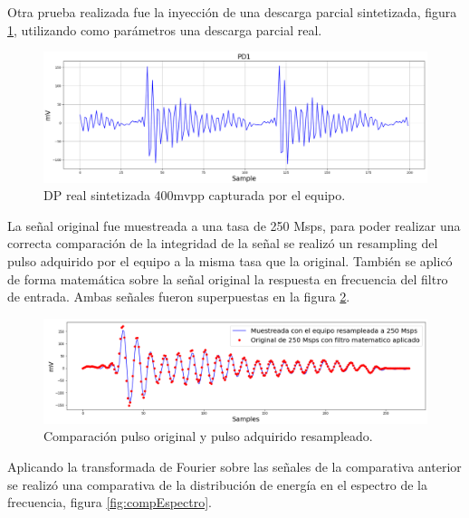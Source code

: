 \vspace{5mm}


Otra prueba realizada fue la inyección de una descarga parcial sintetizada, figura \ref{fig:dpSint}, utilizando como parámetros una descarga parcial real. 

\begin{figure}[ht]
	\centering
	\includegraphics[width=140mm]{./Figures/dpSint.png}
	\caption{DP real sintetizada 400mvpp capturada por el equipo.}
	\label{fig:dpSint}
\end{figure}

La señal original fue muestreada a una tasa de 250 Msps, para poder realizar una correcta comparación de la integridad de la señal se realizó un resampling del pulso adquirido por el equipo a la misma tasa que la original. También se aplicó de forma matemática sobre la señal original la respuesta en frecuencia del filtro de entrada. Ambas señales fueron superpuestas en la figura \ref{fig:compPulsos}.

\begin{figure}[ht]
	\centering
	\includegraphics[width=140mm]{./Figures/compPulsos.png}
	\caption{Comparación pulso original y pulso adquirido resampleado.}
	\label{fig:compPulsos}
\end{figure}

\vspace{20mm}

Aplicando la transformada de Fourier sobre las señales de la comparativa anterior se realizó una comparativa de la distribución de energía en el espectro de la frecuencia, figura \ref{fig:compEspectro}.

\vspace{5mm}

